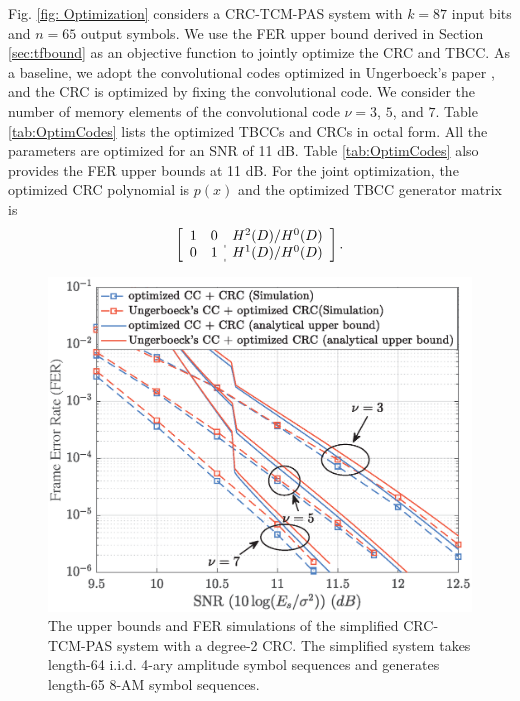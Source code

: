 \documentclass [PhD] {uclathes}
\begin{document}
Fig. \ref{fig: Optimization} considers a  CRC-TCM-PAS system with $k=87$ input bits and $n=65$ output symbols. We use the FER upper bound derived in Section \ref{sec:tfbound} as an objective function to jointly optimize the CRC and TBCC. As a baseline, we adopt the convolutional codes optimized in Ungerboeck's paper \cite{ungerboeck1982channel}, and the CRC is optimized by fixing the convolutional code. We consider the number of memory elements of the convolutional code $\nu=3$, $5$, and $7$. Table \ref{tab:OptimCodes} lists the optimized TBCCs and CRCs in octal form. All the parameters are optimized for an SNR of 11 dB. Table \ref{tab:OptimCodes} also provides the FER upper bounds at 11 dB. For the joint optimization, the optimized CRC polynomial is $p(x)$ and the optimized TBCC generator matrix is 
\begin{equation}
    \left[\begin{array}{c c:c}
    1 & 0 &  {H^2(D)}/{H^0(D)} \\ 
    0 & 1 &  {H^1(D)}/{H^0(D)}
    \end{array} \right].
\end{equation}
\begin{figure}[t] 
    \centering
      \includegraphics[width=0.6\linewidth]{figures/Figure_1_analytical.eps}
      \caption{The upper bounds and FER simulations of the simplified CRC-TCM-PAS system with a degree-2 CRC. The simplified system takes length-64 i.i.d. 4-ary amplitude symbol sequences and generates length-65 8-AM symbol sequences.  }
      \label{fig: unionbound}
\end{figure}
\end{document}
